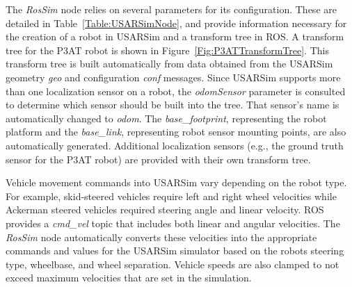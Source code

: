 The {\it RosSim} node relies on several parameters for its configuration. These are detailed in Table~\ref{Table:USARSimNode}, and provide information necessary for the creation of a robot in USARSim and a transform tree in ROS. A transform tree for the P3AT robot is shown in Figure~\ref{Fig:P3ATTransformTree}. This transform tree is built automatically from data obtained from the USARSim geometry {\it geo} and configuration {\it conf} messages. Since USARSim supports more than one localization sensor on a robot, the {\it odomSensor} parameter is consulted to determine which sensor should be built into the tree. That sensor's name is automatically changed to {\it odom}. The {\it base\_footprint}, representing the robot platform and the {\it base\_link}, representing robot sensor mounting points, are also automatically generated. Additional localization sensors (e.g., the ground truth sensor for the P3AT robot) are provided with their own transform tree.

Vehicle movement commands into USARSim vary depending on the robot type. For example, skid-steered vehicles require left and right wheel velocities while Ackerman steered vehicles required steering angle and linear velocity. ROS provides a {\it cmd\_vel} topic that includes both linear and angular velocities. The {\it RosSim} node automatically converts these velocities into the appropriate commands and values for the USARSim simulator based on the robots steering type, wheelbase, and wheel separation. Vehicle speeds are also clamped to not exceed maximum velocities that are set in the simulation.
